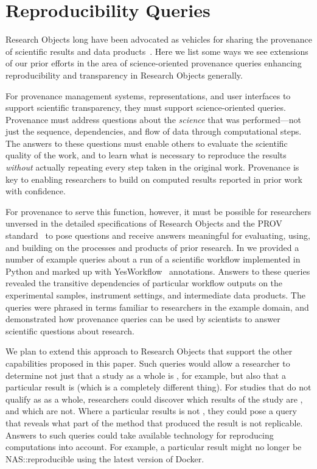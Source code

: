 \section{Reproducibility Queries}\label{sec-transparency}

Research Objects long have been advocated as vehicles for sharing the
	provenance of scientific results and data products~\cite{bechhofer2013whya}.
Here we list some ways we see extensions of our prior efforts in the area
	of science-oriented provenance queries
    enhancing reproducibility and transparency in
	Research Objects generally.

For provenance management systems, representations, and user interfaces to support
	scientific transparency, they must support science-oriented queries.
Provenance must address questions about the \emph{science} that was performed---not just the
	sequence, dependencies, and flow of data through computational steps.
The answers to these questions must enable others to evaluate the scientific quality of the work,
	and to learn what is necessary to
	reproduce the results \emph{without} actually repeating every step taken in the original work.
Provenance is key to enabling researchers to build on computed results reported in prior work with confidence.

For provenance to serve this function, however, it must be possible for researchers unversed in the detailed
	specifications of Research Objects and the PROV standard~\cite{groth2013provoverviewa} to pose
	questions and receive answers meaningful for evaluating, using, and building on the
	processes and products of prior research.
In \cite{mcphillips2015retrospective} we provided a number of example queries about a run of a scientific
	workflow implemented in Python and marked up with YesWorkflow~\cite{mcphillips2015yesworkflowa} annotations.
Answers to these queries revealed the transitive dependencies of particular workflow outputs
	on the experimental samples, instrument settings, and intermediate data products.
The queries were phrased in terms familiar to researchers in the example domain,
	and demonstrated how provenance queries can be used by scientists
	to answer scientific questions about research.

We plan to extend this approach to Research Objects that support the other capabilities
	proposed in this paper.
Such queries would allow a researcher to determine not just that a study as a whole
	is , for example, but also that a particular result
	is  (which is a completely different thing).
For studies that do not qualify as  as a whole, researchers
	could discover which results of the study are , and which are not.
Where a particular results is not , they could pose a query
	that reveals what part of the method that produced the result is
	not replicable.
Answers to such queries could take available technology for reproducing computations
	into account.
For example, a particular result might no longer be NAS::reproducible using the
	latest version of Docker.
